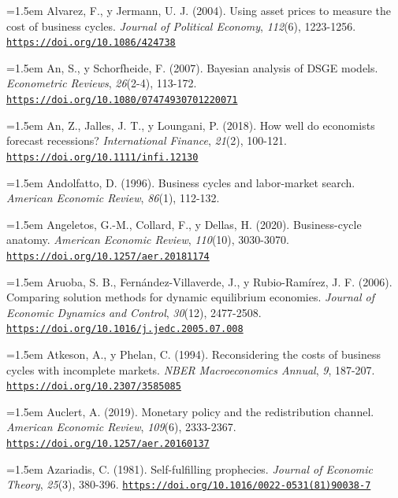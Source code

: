 \documentclass[10pt,a4paper]{article}
\begin{document}
\noindent\hangindent=1.5em Alvarez, F., y Jermann, U. J. (2004). Using asset prices to measure the cost of business cycles. \textit{Journal of Political Economy}, \textit{112}(6), 1223-1256. \href{https://doi.org/10.1086/424738}{\nolinkurl{https://doi.org/10.1086/424738}}

\noindent\hangindent=1.5em An, S., y Schorfheide, F. (2007). Bayesian analysis of DSGE models. \textit{Econometric Reviews}, \textit{26}(2-4), 113-172. \href{https://doi.org/10.1080/07474930701220071}{\nolinkurl{https://doi.org/10.1080/07474930701220071}}

\noindent\hangindent=1.5em An, Z., Jalles, J. T., y Loungani, P. (2018). How well do economists forecast recessions? \textit{International Finance}, \textit{21}(2), 100-121. \href{https://doi.org/10.1111/infi.12130}{\nolinkurl{https://doi.org/10.1111/infi.12130}}

\noindent\hangindent=1.5em Andolfatto, D. (1996). Business cycles and labor-market search. \textit{American Economic Review}, \textit{86}(1), 112-132.

\noindent\hangindent=1.5em Angeletos, G.-M., Collard, F., y Dellas, H. (2020). Business-cycle anatomy. \textit{American Economic Review}, \textit{110}(10), 3030-3070. \href{https://doi.org/10.1257/aer.20181174}{\nolinkurl{https://doi.org/10.1257/aer.20181174}}

\noindent\hangindent=1.5em Aruoba, S. B., Fernández-Villaverde, J., y Rubio-Ramírez, J. F. (2006). Comparing solution methods for dynamic equilibrium economies. \textit{Journal of Economic Dynamics and Control}, \textit{30}(12), 2477-2508. \href{https://doi.org/10.1016/j.jedc.2005.07.008}{\nolinkurl{https://doi.org/10.1016/j.jedc.2005.07.008}}

\noindent\hangindent=1.5em Atkeson, A., y Phelan, C. (1994). Reconsidering the costs of business cycles with incomplete markets. \textit{NBER Macroeconomics Annual}, \textit{9}, 187-207. \href{https://doi.org/10.2307/3585085}{\nolinkurl{https://doi.org/10.2307/3585085}}

\noindent\hangindent=1.5em Auclert, A. (2019). Monetary policy and the redistribution channel. \textit{American Economic Review}, \textit{109}(6), 2333-2367. \href{https://doi.org/10.1257/aer.20160137}{\nolinkurl{https://doi.org/10.1257/aer.20160137}}

\noindent\hangindent=1.5em Azariadis, C. (1981). Self-fulfilling prophecies. \textit{Journal of Economic Theory}, \textit{25}(3), 380-396. \href{https://doi.org/10.1016/0022-0531(81)90038-7}{\nolinkurl{https://doi.org/10.1016/0022-0531(81)90038-7}}
\end{document}
